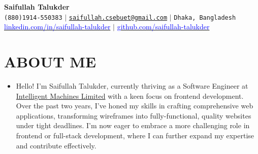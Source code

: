 \documentclass[letterpaper,10pt]{article}
\newcommand{\resumeItem}[1]{
  \item\small{
    {#1 \vspace{-1pt}}
  }
}
\begin{document}
\begin{center}
    \textbf{\Huge Saifullah Talukder} \\ \vspace{5pt}
    \small \faPhone* \texttt{(880)1914-550383} \hspace{1pt} $|$
    \hspace{1pt} \faEnvelope \hspace{2pt} \texttt{\href{mailto:saifullah.cse16.buet@gmail.com}{saifullah.csebuet@gmail.com}} \hspace{1pt} $|$ 
    \hspace{1pt} \faMapMarker* \hspace{2pt}\texttt{Dhaka, Bangladesh}
    \\ \vspace{5pt}
    \hspace{1pt} \faLinkedin \hspace{2pt} \href{https://www.linkedin.com/in/saifullah-talukder}{\textcolor{blue}{linkedin.com/in/saifullah-talukder}} \hspace{1pt} $|$
    \hspace{1pt} \faGithub \hspace{2pt} \href{https://github.com/saifullah-talukder}{\textcolor{blue}{github.com/saifullah-talukder}} \hspace{1pt} %
    \\ \vspace{-5pt}
\end{center}

\section{ABOUT ME}
 \begin{itemize}[leftmargin=0in, label={}]
    \resumeItem {Hello! I'm Saifullah Talukder, currently thriving as a Software Engineer at {\textcolor{blue}{\href{https://bangladesh.ai/}{Intelligent Machines Limited}}} with a keen focus on frontend development. Over the past two years, I've honed my skills in crafting comprehensive web applications, transforming wireframes into fully-functional, quality websites under tight deadlines. I'm now eager to embrace a more challenging role in frontend or full-stack development, where I can further expand my expertise and contribute effectively.}
    
 \end{itemize}
\end{document}
